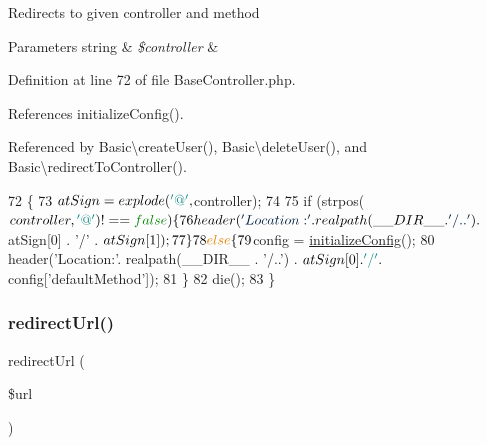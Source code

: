 Redirects to given controller and method


\begin{DoxyParams}[1]{Parameters}
string & {\em \$controller} & \\
\hline
\end{DoxyParams}


Definition at line 72 of file Base\+Controller.\+php.



References initialize\+Config().



Referenced by Basic\textbackslash{}create\+User(), Basic\textbackslash{}delete\+User(), and Basic\textbackslash{}redirect\+To\+Controller().


\begin{DoxyCode}
72                                                        \{
73         $atSign = explode(\textcolor{charliteral}{'@'}, $controller);
74 
75         \textcolor{keywordflow}{if} (strpos($controller, \textcolor{charliteral}{'@'}) !== \textcolor{keyword}{false}) \{
76             header(\textcolor{stringliteral}{'Location:'} . realpath(\_\_DIR\_\_ . \textcolor{stringliteral}{'/..'}) . $atSign[0] . \textcolor{charliteral}{'/'} . $atSign[1]);
77         \}
78         \textcolor{keywordflow}{else} \{
79             $config = \hyperlink{config_8php_afeb1d281d402615776fdb0320a5b8d05}{initializeConfig}();
80             header(\textcolor{stringliteral}{'Location:'}. realpath(\_\_DIR\_\_ . \textcolor{stringliteral}{'/..'}) . $atSign[0] . \textcolor{charliteral}{'/'} . $config[\textcolor{stringliteral}{'defaultMethod'}]);
81         \}
82         die();
83     \}
\end{DoxyCode}
\hypertarget{class_base_controller_a9f95c7503770ed9c974005b363ec3d00}{}\label{class_base_controller_a9f95c7503770ed9c974005b363ec3d00} 
\subsubsection{\texorpdfstring{redirect\+Url()}{redirectUrl()}}
{\footnotesize\ttfamily redirect\+Url (\begin{DoxyParamCaption}\item[{}]{\$url }\end{DoxyParamCaption})\hspace{0.3cm}{\ttfamily [protected]}}

